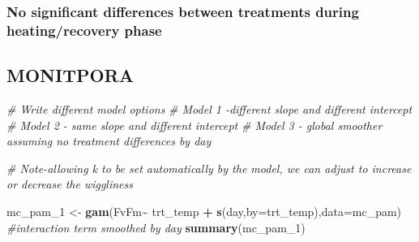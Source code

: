 \documentclass[
]{article}
\newenvironment{Shaded}{\begin{snugshade}}{\end{snugshade}}
\newcommand{\AttributeTok}[1]{\textcolor[rgb]{0.13,0.29,0.53}{#1}}
\newcommand{\CommentTok}[1]{\textcolor[rgb]{0.56,0.35,0.01}{\textit{#1}}}
\newcommand{\FunctionTok}[1]{\textcolor[rgb]{0.13,0.29,0.53}{\textbf{#1}}}
\newcommand{\NormalTok}[1]{#1}
\newcommand{\OtherTok}[1]{\textcolor[rgb]{0.56,0.35,0.01}{#1}}
\newcommand{\SpecialCharTok}[1]{\textcolor[rgb]{0.81,0.36,0.00}{\textbf{#1}}}
\begin{document}
\hypertarget{no-significant-differences-between-treatments-during-heatingrecovery-phase}{%
\subsubsection{No significant differences between treatments during
heating/recovery
phase}\label{no-significant-differences-between-treatments-during-heatingrecovery-phase}}

\hypertarget{monitpora}{%
\subsection{MONITPORA}\label{monitpora}}

\begin{Shaded}
\begin{Highlighting}[]
\CommentTok{\# Write different model options}
  \CommentTok{\# Model 1 {-}different slope and different intercept}
  \CommentTok{\# Model 2 {-} same slope and different intercept}
  \CommentTok{\# Model 3 {-} global smoother assuming no treatment differences by day}

\CommentTok{\# Note{-}allowing \textquotesingle{}k\textquotesingle{} to be set automatically by the model, we can adjust to increase or decrease the \textquotesingle{}wiggliness\textquotesingle{}}
  
\NormalTok{mc\_pam\_1 }\OtherTok{\textless{}{-}} \FunctionTok{gam}\NormalTok{(FvFm}\SpecialCharTok{\textasciitilde{}}\NormalTok{ trt\_temp }\SpecialCharTok{+} \FunctionTok{s}\NormalTok{(day,}\AttributeTok{by=}\NormalTok{trt\_temp),}\AttributeTok{data=}\NormalTok{mc\_pam) }\CommentTok{\#interaction term smoothed by day}
\FunctionTok{summary}\NormalTok{(mc\_pam\_1)}
\end{Highlighting}
\end{Shaded}
\end{document}
